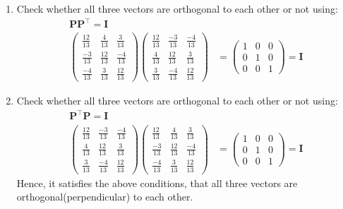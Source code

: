 \documentclass[12pt]{article}
\newcommand{\myvec}[1]{\ensuremath{\begin{pmatrix}#1\end{pmatrix}}}
\let\vec\mathbf
\begin{document}
			\begin{enumerate}
				\item Check whether all three vectors are orthogonal to each other or not using: 
			\begin{align}
		\vec{P}\vec{P}^\top=\vec{I}\\
				\myvec{\frac{12}{13}&\frac{4}{13}    &\frac{3}{13}\\[2pt] \frac{-3}{13}&\frac{12}{13}&\frac{-4}{13}\\[2pt] \frac{-4}{13}&\frac{3}{13}&\frac{12}{13}}\myvec{\frac{12}{13}&\frac{-3}{13}   &\frac{-4}{13}\\[2pt] \frac{4}{13}&\frac{12}{13}&\frac{3}{13}\\[2pt] \frac{3}{13}&\frac{-4}{13}&\frac{12}{13}}&=\myvec{1&0&0\\[2pt]0&1&0\\[2pt]0&0&1}=\vec{I}
		\end{align}
	\item Check whether all three vectors are orthogonal to each other or not using:
\begin{align}
	\vec{P}^\top\vec{P}=\vec{I}\\
				\myvec{\frac{12}{13}&\frac{-3}{13}    &\frac{-4}{13}\\[2pt] \frac{4}{13}&\frac{12}{13}&\frac{3}{13}\\[2pt] \frac{3}{13}&\frac{-4}{13}&\frac{12}{13}}\myvec{\frac{12}{13}&\frac{4}{13}   &\frac{3}{13}\\[2pt] \frac{-3}{13}&\frac{12}{13}&\frac{-4}{13}\\[2pt] \frac{-4}{13}&\frac{3}{13}&\frac{12}{13}}&=\myvec{1&0&0\\[2pt]0&1&0\\[2pt]0&0&1}=\vec{I}
		\end{align}
					Hence, it satisfies the above conditions, that all three vectors are orthogonal(perpendicular) to each other.
			\end{enumerate}
\end{document}
